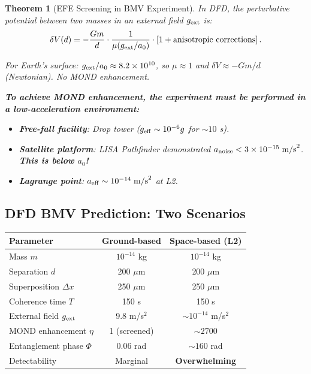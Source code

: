 \documentclass[11pt,a4paper]{article}
\newtheorem{theorem}{Theorem}
\begin{document}
\begin{theorem}[EFE Screening in BMV Experiment]
\label{thm:EFE-BMV}
In DFD, the perturbative potential between two masses in an external field $g_{\rm ext}$ is:
\begin{equation}
\delta V(d) = -\frac{Gm}{d}\cdot\frac{1}{\mu(g_{\rm ext}/a_0)}\cdot\left[1 + \text{anisotropic corrections}\right].
\end{equation}

For Earth's surface: $g_{\rm ext}/a_0 \approx 8.2\times 10^{10}$, so $\mu \approx 1$ and $\delta V \approx -Gm/d$ (Newtonian). No MOND enhancement.

\textbf{To achieve MOND enhancement, the experiment must be performed in a low-acceleration environment:}
\begin{itemize}
\item \textbf{Free-fall facility}: Drop tower ($g_{\rm eff} \sim 10^{-6}g$ for $\sim 10$ s).
\item \textbf{Satellite platform}: LISA Pathfinder demonstrated $a_{\rm noise} < 3\times 10^{-15}\;\text{m/s}^2$. \textbf{This is below $a_0$!}
\item \textbf{Lagrange point}: $a_{\rm eff} \sim 10^{-14}\;\text{m/s}^2$ at L2.
\end{itemize}
\end{theorem}

\subsection{DFD BMV Prediction: Two Scenarios}

\begin{center}
\begin{tabular}{lcc}
\toprule
\textbf{Parameter} & \textbf{Ground-based} & \textbf{Space-based (L2)} \\
\midrule
Mass $m$ & $10^{-14}$ kg & $10^{-14}$ kg \\
Separation $d$ & 200 $\mu$m & 200 $\mu$m \\
Superposition $\Delta x$ & 250 $\mu$m & 250 $\mu$m \\
Coherence time $T$ & 150 s & 150 s \\
External field $g_{\rm ext}$ & 9.8 m/s$^2$ & $\sim 10^{-14}$ m/s$^2$ \\
MOND enhancement $\eta$ & 1 (screened) & $\sim 2700$ \\
Entanglement phase $\Phi$ & 0.06 rad & $\sim 160$ rad \\
Detectability & Marginal & \textbf{Overwhelming} \\
\bottomrule
\end{tabular}
\end{center}
\end{document}
